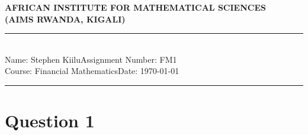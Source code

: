 \documentclass[12pt,a4paper]{article}
\newcommand{\student}{Stephen Kiilu}
\newcommand{\course}{Financial Mathematics}
\newcommand{\assignment}{FM1}
\begin{document}
\thispagestyle{empty}
\begin{center}
\textbf{AFRICAN INSTITUTE FOR MATHEMATICAL SCIENCES \\[0.5cm]
(AIMS RWANDA, KIGALI)}
\vspace{1.0cm}
\end{center}

\noindent
\rule{17cm}{0.2cm}\\[0.3cm]
Name: \student \hfill Assignment Number: \assignment\\[0.1cm]
Course: \course \hfill Date: \today\\
\rule{17cm}{0.05cm}
\vspace{1.0cm}


\section*{Question 1}
\end{document}

